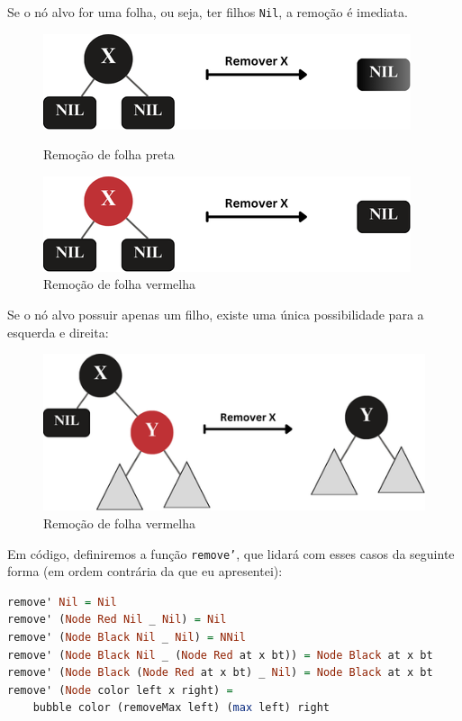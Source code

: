 Se o nó alvo for uma folha, ou seja, ter filhos \texttt{Nil}, a remoção é imediata.


\begin{figure}[!ht]
	\centering
	\includegraphics[scale=0.8]{figures/rubro-negra/black-leaf-removal.png}
	\caption{Remoção de folha preta}
	\vspace{3em}
	\centering
	\includegraphics[scale=0.8]{figures/rubro-negra/remove-red-leaf.png}
	\caption{Remoção de folha vermelha}
\end{figure}
\FloatBarrier

Se o nó alvo possuir apenas um filho, existe uma única possibilidade para a esquerda e direita:

\begin{figure}[!ht]
	\centering
	\includegraphics[scale=0.8]{figures/rubro-negra/target-black-one-child.png}
	\caption{Remoção de folha vermelha}
\end{figure}
\FloatBarrier

Em código, definiremos a função \texttt{remove'}, que lidará com esses casos da seguinte forma (em ordem contrária da que eu apresentei):

\begin{lstlisting}[language=Haskell]
remove' Nil = Nil
remove' (Node Red Nil _ Nil) = Nil
remove' (Node Black Nil _ Nil) = NNil
remove' (Node Black Nil _ (Node Red at x bt)) = Node Black at x bt
remove' (Node Black (Node Red at x bt) _ Nil) = Node Black at x bt
remove' (Node color left x right) = 
	bubble color (removeMax left) (max left) right
\end{lstlisting}
\FloatBarrier

